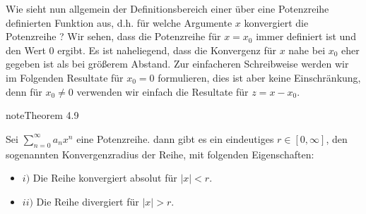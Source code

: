 \documentclass[letterpaper,10pt,english]{jupyterBook}
\begin{document}
Wie sieht nun allgemein der Definitionsbereich einer über eine Potenzreihe definierten Funktion aus, d.h. für welche Argumente \(x\) konvergiert die Potenzreihe ? Wir sehen, dass die Potenzreihe für \(x=x_0\) immer definiert ist und den Wert \(0\) ergibt. Es ist naheliegend, dass die Konvergenz für \(x\) nahe bei \(x_0\) eher gegeben ist als bei größerem Abstand. Zur einfacheren Schreibweise werden wir im Folgenden Resultate für \(x_0 = 0\) formulieren, dies ist aber keine Einschränkung, denn für \(x_0 \neq 0\) verwenden wir einfach die Resultate für \(z=x-x_0\).
\label{metrik/potenzreihen:theorem-1}
\begin{sphinxadmonition}{note}{Theorem 4.9}



Sei \(\sum_{n=0}^\infty a_n x^n\) eine Potenzreihe. dann gibt es ein eindeutiges \(r \in [0,\infty]\), den sogenannten Konvergenzradius der Reihe, mit folgenden Eigenschaften:
\begin{itemize}
\item {} 
\(i)\) Die Reihe konvergiert absolut für \(|x| < r\).

\item {} 
\(ii)\) Die Reihe divergiert für \(|x| > r\).

\end{itemize}
\end{sphinxadmonition}
\end{document}
